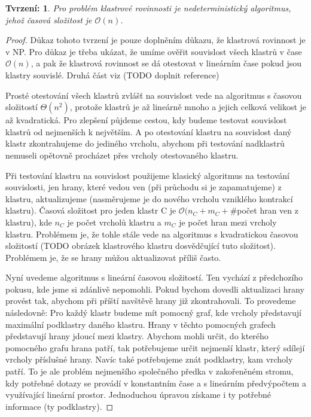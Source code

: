 \documentclass[12pt,a4report]{report}
\newtheorem{tvr}{Tvrzení: }[chapter]
\begin{document}
\begin{tvr}
Pro problém klastrové rovinnosti je nedeterministický algoritmus, jehož časová složitost je $\mathcal{O}(n)$.
\end{tvr}
\begin{proof}

Důkaz tohoto tvrzení je pouze doplněním důkazu, že klastrová rovinnost je v NP. Pro důkaz je třeba ukázat, že umíme ověřit souvislost všech klastrů v čase $\mathcal{O}(n)$, a pak že klastrová rovinnost se dá otestovat v lineárním čase pokud jsou klastry souvislé.
Druhá část viz (TODO doplnit reference)

Prosté otestování všech klastrů zvlášť na souvislost vede na algoritmus s časovou složitostí $\Theta(n^2)$, protože klastrů je až lineárně mnoho a jejich celková velikost je až kvadratická. Pro zlepšení půjdeme cestou, kdy budeme testovat souvislost klastrů od nejmenších k největším. A po otestování klastru na souvislost daný klastr zkontrahujeme do jediného vrcholu, abychom při testování nadklastrů nemuseli opětovně procházet přes vrcholy otestovaného klastru.

Při testování klastru na souvislost použijeme klasický algoritmus na testování souvislosti, jen hrany, které vedou ven (při průchodu si je zapamatujeme) z klastru, aktualizujeme (nasměrujeme je do nového vrcholu vzniklého kontrakcí klastru). Časová složitost pro jeden klastr C je $\mathcal{O}(n_C + m_C + \#$počet hran ven z klastru), kde $n_C$ je počet vrcholů klastru a $m_C$ je počet hran mezi vrcholy klastru. Problémem je, že tohle stále vede na algoritmus s kvadratickou časovou složitostí (TODO obrázek klastrového klastru dosvědčující tuto složitost). Problémem je, že se hrany můžou aktualizovat příliš často.

Nyní uvedeme algoritmus s lineární časovou složitostí. Ten vychází z předchozího pokusu, kde jsme si zdánlivě nepomohli. Pokud bychom dovedli aktualizaci hrany provést tak, abychom při příští navštěvě hrany již zkontrahovali. To provedeme následovně: Pro každý klastr budeme mít pomocný graf, kde vrcholy představují maximální podklastry daného klastru. Hrany v těchto pomocných grafech představují hrany jdoucí mezi klastry. Abychom mohli určit, do kterého pomocného grafu hrana patří, tak potřebujeme určit nejmenší klastr, který sdílejí vrcholy příslušné hrany. Navíc také potřebujeme znát podklastry, kam vrcholy patří. To je ale problém nejmenšího společného předka v zakořeněném stromu, kdy potřebné dotazy se provádí v konstantním čase a s lineárním předvýpočtem a využívající lineární prostor. Jednoduchou úpravou získame i ty potřebné informace (ty podklastry).


\end{proof}
\end{document}

